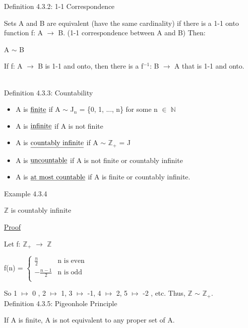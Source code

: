 { \color{blue} Definition  4.3.2: 1-1 Correspondence} 

	\begin{adjustbox}{minipage=14cm, right}
		Sets A and B are equivalent {\color{lblue} (have the same cardinality)} if there is
		a 1-1 onto function f: A $\rightarrow$ B. {\color{lblue} (1-1 correspondence between A and B)}
		Then:

		\qquad A $\sim$ B

		If f: A $\rightarrow$ B is 1-1 and onto, then
		there is a f$^{-1}$: B $\rightarrow$ A that is 1-1 and onto.
	\end{adjustbox}
\hfill \\

{ \color{blue} Definition 4.3.3: Countability } 
	\begin{itemize}[leftmargin=2cm]
		\item A is $\text{\underline{finite}}$ if A $\sim$ J$_n$ = \{0, 1, ..., n\}
			for some n $\in$ $\mathbb{N}$
		\item A is $\text{\underline{infinite}}$ if A is not finite
		\item A is $\text{\underline{countably infinite}}$ if A $\sim$ $\mathbb{Z}_+$ = J
		\item A is $\text{\underline{uncountable}}$ if A is not finite or countably infinite
		\item A is $\text{\underline{at most countable}}$ if A is finite or countably infinite.
	\end{itemize}

{ \color{purple} Example 4.3.4 } 

	\qquad $\mathbb{Z}$ is countably infinite

{ \color{magenta} \underline{Proof} } 

	Let f: $\mathbb{Z}_+$ $\rightarrow$ $\mathbb{Z}$

	\hspace{0.5cm} f(n) = 
	$
	\begin{cases}
		\frac{n}{2} & \text{n is even} \\
		-\frac{n-1}{2} & \text{n is odd} \\
	\end{cases}
	$

	So 1 $\mapsto$ 0 , 2 $\mapsto$ 1, 3 $\mapsto$ -1, 4 $\mapsto$ 2, 5 $\mapsto$ -2 , etc.
	Thus, $\mathbb{Z}$ $\sim$ $\mathbb{Z}_+$. \\ 

{ \color{blue} Definition 4.3.5: Pigeonhole Principle } 

	\qquad If A is finite, A is not equivalent to any proper set of A. \\


